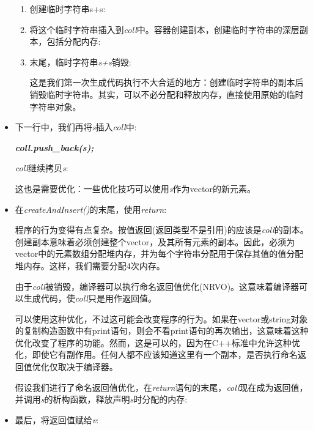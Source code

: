 \begin{itemize}
  \begin{enumerate}
    \item 创建临时字符串s+s:\par
{}
    \item 将这个临时字符串插入到\textit{coll}中。容器创建副本，创建临时字符串的深层副本，包括分配内存:\par
{}
    \item 末尾，临时字符串\textit{s+s}销毁:\par
{}
    这是我们第一次生成代码执行不大合适的地方：创建临时字符串的副本后销毁临时字符串。其实，可以不必分配和释放内存，直接使用原始的临时字符串对象。
  \end{enumerate}
  \item 下一行中，我们再将\textit{s}插入\textit{coll}中:\par
  \textbf{\textit{coll.push\_\allowbreak{}back(\allowbreak{}s)\allowbreak{};}}\par
  \textit{coll}继续拷贝\textit{s}:\par
{}
  这也是需要优化：一些优化技巧可以使用\textit{s}作为vector的新元素。
  \item 在\textit{createAndInsert(\allowbreak{})\allowbreak{}}的末尾，使用\textit{return}:\par
\begin{codebox}[cpp]
    return coll;
  }
\end{codebox}
  程序的行为变得有点复杂。按值返回(返回类型不是引用)的应该是\textit{coll}的副本。创建副本意味着必须创建整个vector，及其所有元素的副本。因此，必须为vector中的元素数组分配堆内存，并为每个字符串分配用于保存其值的值分配堆内存。这样，我们需要分配4次内存。\par
  由于\textit{coll}被销毁，编译器可以执行命名返回值优化(NRVO)。这意味着编译器可以生成代码，使\textit{coll}只是用作返回值。\par
  可以使用这种优化，不过这可能会改变程序的行为。如果在vector或string对象的复制构造函数中有print语句，则会不看print语句的再次输出，这意味着这种优化改变了程序的功能。然而，这是可以的，因为在C++标准中允许这种优化，即使它有副作用。任何人都不应该知道这里有一个副本，是否执行命名返回值优化仅取决于编译器。\par
  假设我们进行了命名返回值优化，在\textit{return}语句的末尾，\textit{coll}现在成为返回值，并调用\textit{s}的析构函数，释放声明\textit{s}时分配的内存:\par
{}
  \item 最后，将返回值赋给\textit{v}:\par

\end{itemize}
